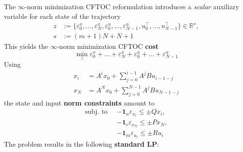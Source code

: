 \newpar{}
\label{l_inf_CFTOC}

The $\infty$-norm minimization CFTOC reformulation introduces a \textit{scalar} auxiliary variable for each state of the trajectory
\begin{align*}
    z & := \{ \varepsilon_{0}^x, \dots, \varepsilon_{N}^x, \varepsilon_{0}^u, \dots, \varepsilon_{N-1}^u, u_0^\top, \dots, u_{N-1}^\top \} \in \mathbb{R}^s, \\
    s & := (m + 1) N + N + 1
\end{align*}
This yields the $\infty$-norm minimization CFTOC \textbf{cost}
\begin{equation*}
    \min_z \varepsilon_{0}^x + \dots + \varepsilon_{N}^x + \varepsilon_{0}^u + \dots + \varepsilon_{N-1}^u
\end{equation*}
Using
\begin{align*}
    x_i & = A^i x_0 + \sum_{j=0}^{i-1} A^j B u_{i-1-j} \\
    x_N & = A^N x_0 + \sum_{j=0}^{N-1} A^j B u_{N-1-j}
\end{align*}
the state and input \textbf{norm constraints} amount to
\begin{align*}
    \text{subj.\ to } \  & -\mathbf{1}_n \varepsilon_{x_i} \leq \pm Q x_i, \\
                         & -\mathbf{1}_r \varepsilon_{x_N} \leq \pm P x_N, \\
                         & -\mathbf{1}_m \varepsilon_{u_i} \leq \pm R u_i
\end{align*}
The problem results in the following \textbf{standard LP}:
